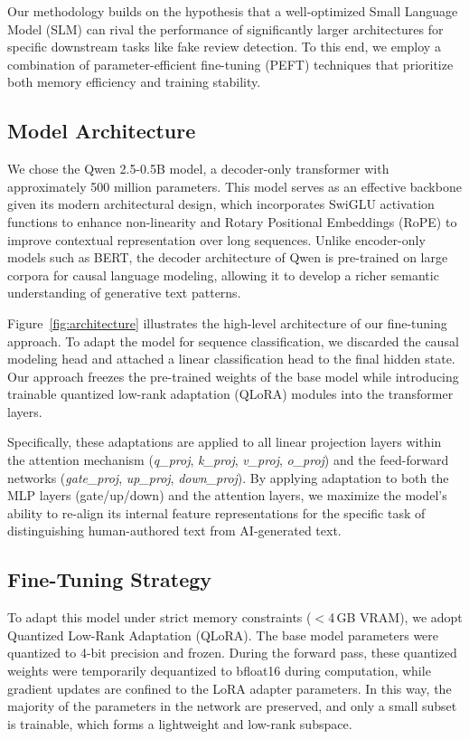 \documentclass[utf8]{FrontiersinHarvard}
\begin{document}
Our methodology builds on the hypothesis that a well-optimized Small Language Model (SLM) can rival the performance of significantly larger architectures for specific downstream tasks like fake review detection. To this end, we employ a combination of parameter-efficient fine-tuning (PEFT) techniques that prioritize both memory efficiency and training stability.

\subsection{Model Architecture}

We chose the Qwen 2.5-0.5B model, a decoder-only transformer with approximately 500 million parameters. This model serves as an effective backbone given its modern architectural design, which incorporates SwiGLU activation functions to enhance non-linearity and Rotary Positional Embeddings (RoPE) to improve contextual representation over long sequences. Unlike encoder-only models such as BERT, the decoder architecture of Qwen is pre-trained on large corpora for causal language modeling, allowing it to develop a richer semantic understanding of generative text patterns.

Figure~\ref{fig:architecture} illustrates the high-level architecture of our fine-tuning approach. To adapt the model for sequence classification, we discarded the causal modeling head and attached a linear classification head to the final hidden state. Our approach freezes the pre-trained weights of the base model while introducing trainable quantized low-rank adaptation (QLoRA) modules into the transformer layers.

Specifically, these adaptations are applied to all linear projection layers within the attention mechanism (\textit{q\_proj}, \textit{k\_proj}, \textit{v\_proj}, \textit{o\_proj}) and the feed-forward networks (\textit{gate\_proj}, \textit{up\_proj}, \textit{down\_proj}). By applying adaptation to both the MLP layers (gate/up/down) and the attention layers, we maximize the model's ability to re-align its internal feature representations for the specific task of distinguishing human-authored text from AI-generated text.

\subsection{Fine-Tuning Strategy}

To adapt this model under strict memory constraints ($<$4\,GB VRAM), we adopt Quantized Low-Rank Adaptation (QLoRA). The base model parameters were quantized to 4-bit precision and frozen. During the forward pass, these quantized weights were temporarily dequantized to bfloat16 during computation, while gradient updates are confined to the LoRA adapter parameters. In this way, the majority of the parameters in the network are preserved, and only a small subset is trainable, which forms a lightweight and low-rank subspace.
\end{document}
